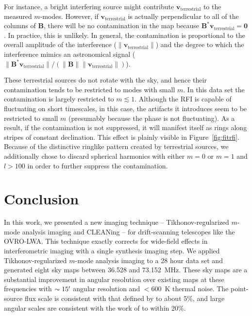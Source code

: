 \documentclass[twocolumn]{aastex61}
\renewcommand{\b}{\pmb}
\begin{document}
For instance, a bright interfering source might contribute $\b v_\text{terrestrial}$ to the measured
$m$-modes. However, if $\b v_\text{terrestrial}$ is actually perpendicular to all of the columns of
$\b B$, there will be no contamination in the map because $\b B^*\b v_\text{terrestrial} = \b 0$.
In practice, this is unlikely. In general, the contamination is proportional to the overall amplitude
of the interference ($\|\b v_\text{terrestrial}\|$) and the degree to which the interference mimics
an astronomical signal ($\|\b B^*\b v_\text{terrestrial}\|/(\|\b B\|\|\b v_\text{terrestrial}\|)$).

These terrestrial sources do not rotate with the sky, and hence their contamination tends to be
restricted to modes with small $m$. In this data set the contamination is largely restricted to $m
\lesssim 1$. Although the RFI is capable of fluctuating on short timescales, in this case, the
artifacts it introduces seem to be restricted to small $m$ (presumably because the phase is not
fluctuating).  As a result, if the contamination is not suppressed, it will manifest itself as rings
along stripes of constant declination. This effect is plainly visible in Figure~\ref{fig:fitrfi}.
Because of the distinctive ringlike pattern created by terrestrial sources, we additionally chose to
discard spherical harmonics with either $m=0$ or $m=1$ and $l>100$ in order to further suppress the
contamination.

\section{Conclusion}\label{sec:conclusion}

In this work, we presented a new imaging technique -- Tikhonov-regularized $m$-mode analysis imaging
and CLEANing -- for drift-scanning telescopes like the OVRO-LWA.  This technique exactly corrects
for wide-field effects in interferometric imaging with a single synthesis imaging step.  We applied
Tikhonov-regularized $m$-mode analysis imaging to a 28 hour data set and generated eight sky maps
between 36.528 and 73.152~MHz.  These sky maps are a substantial improvement in angular resolution
over existing maps at these frequencies with $\sim15\mbox{$^\prime$}$ angular resolution and $<600$~K thermal
noise. The point-source flux scale is consistent with that defined by \citet{2012MNRAS.423L..30S} to
about 5\%, and large angular scales are consistent with the work of \citet{2017MNRAS.469.4537D} to
within 20\%.
\end{document}
